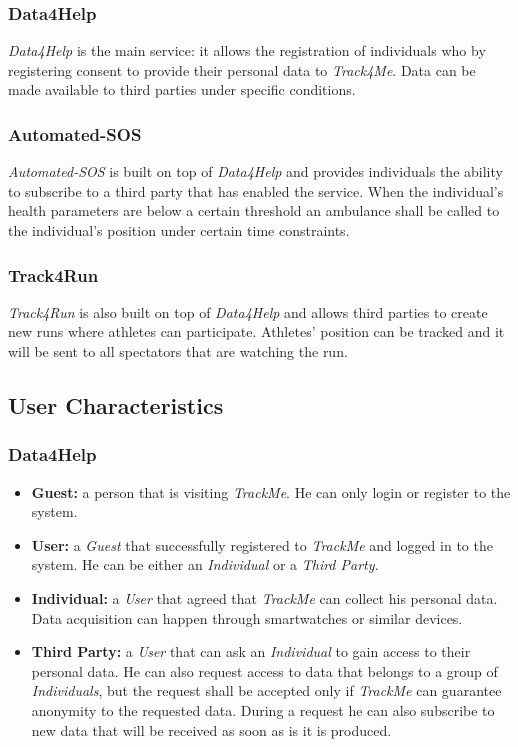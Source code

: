 \documentclass[a4paper]{article}
\begin{document}
    \subsubsection{Data4Help}
    \textit{Data4Help} is the main service: it allows the registration of individuals who by registering consent to provide their personal data to \textit{Track4Me}. Data can be made available to third parties under specific conditions.
    
    \subsubsection{Automated-SOS}
    \textit{Automated-SOS} is built on top of \textit{Data4Help} and provides individuals the ability to subscribe to a third party that has enabled the service. When the individual's health parameters are below a certain threshold an ambulance shall be called to the individual's position under certain time constraints.
    
    \subsubsection{Track4Run}
    \textit{Track4Run} is also built on top of \textit{Data4Help} and allows third parties to create new runs where athletes can participate. Athletes' position can be tracked and it will be sent to all spectators that are watching the run.
    
    \subsection{User Characteristics}
    
        \subsubsection{Data4Help}
        \begin{itemize}
            \item \textbf{Guest:} a person that is visiting \textit{TrackMe}. He can only login or register to the system.
            \item \textbf{User:} a \textit{Guest} that successfully registered to \textit{TrackMe} and logged in to the system. He can be either an \textit{Individual} or a \textit{Third Party.}
            \item \textbf{Individual:} a \textit{User} that agreed that \textit{TrackMe} can collect his personal data. Data acquisition can happen through smartwatches or similar devices.
            \item \textbf{Third Party:} a \textit{User} that can ask an \textit{Individual} to gain access to their personal data. He can also request access to data that belongs to a group of \textit{Individuals}, but the request shall be accepted only if \textit{TrackMe} can guarantee anonymity to the requested data. During a request he can also subscribe to new data that will be received as soon as is it is produced.
        \end{itemize}
        
\end{document}
